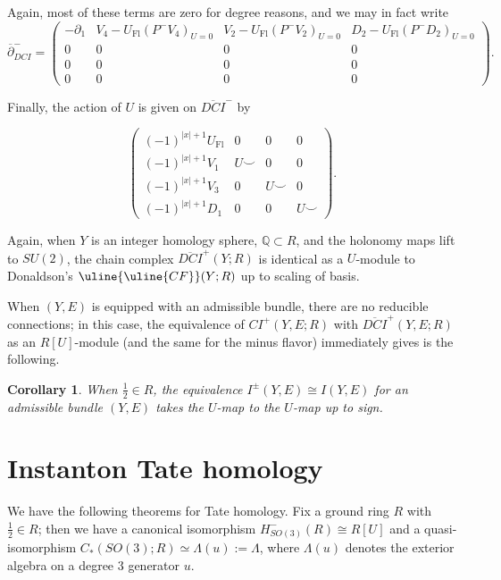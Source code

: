\documentclass{memo-l}
\newtheorem{corollary}[theorem]{Corollary}
\theoremstyle{definition}
\theoremstyle{remark}
\numberwithin{section}{chapter}
\numberwithin{equation}{chapter}
\begin{document}
Again, most of these terms are zero for degree reasons, and we may in fact write 
$$\overline{\partial}^-_{DCI} = \begin{pmatrix}-\partial_1 & V_4 - U_\text{Fl} \left(P^- V_4\right)_{U = 0} & V_2 - U_\text{Fl} \left(P^- V_2\right)_{U = 0} & D_2 -
U_\text{Fl} \left(P^- D_2\right)_{U = 0}\\ 0 & 0 & 0 & 0 \\ 0 & 0 & 0 & 0\\ 0 & 0 & 0 & 0\end{pmatrix}.$$

Finally, the action of $U$ is given on $\overline{DCI}^-$ by 

$$\begin{pmatrix}(-1)^{|x|+1}U_{\text{Fl}} & 0 & 0 & 0 \\ (-1)^{|x|+1} V_1 & U \smile & 0 & 0\\ (-1)^{|x|+1} V_3 & 0 & U\smile & 0 \\ (-1)^{|x|+1} D_1 & 0 & 0 & U \smile \end{pmatrix}.$$

Again, when $Y$ is an integer homology sphere, $\mathbb Q \subset R$, and the holonomy maps lift to $SU(2)$, the chain complex $\overline{DCI}^+(Y;R)$ is identical as a $U$-module to Donaldson's $\uline{\uline{CF}}(Y;R)$ up to scaling of basis.

When $(Y, E)$ is equipped with an admissible bundle, there are no reducible connections; in this case, the equivalence of $CI^+(Y,E;R)$ with $\overline{DCI}^+(Y,E;R)$ as an $R[U]$-module (and the same for the minus flavor) immediately gives is the following.

\begin{corollary}\label{admiss-U}When $\frac 12 \in R$, the equivalence $I^\pm(Y,E) \cong I(Y,E)$ for an admissible bundle $(Y,E)$ takes the $U$-map to the $U$-map up to sign.
\end{corollary}

\section{Instanton Tate homology}\label{sec:ex-tate}
We have the following theorems for Tate homology. Fix a ground ring $R$ with $\frac 12 \in R$; then we have a canonical isomorphism $H^-_{SO(3)}(R) \cong R[U]$ and a quasi-isomorphism $C_*(SO(3);R) \simeq \Lambda(u) := \Lambda$, where $\Lambda(u)$ denotes the exterior algebra on a degree 3 generator $u$. 
\end{document}
